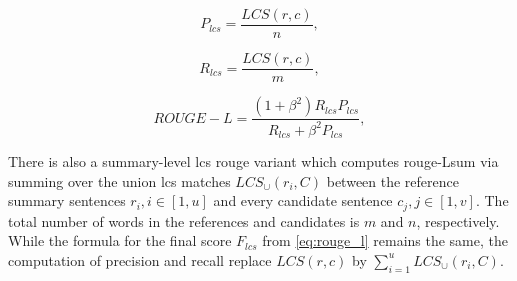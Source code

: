 \begin{equation}
P_{lcs} = \frac{LCS(r,c)}{n},
\label{eq:rouge_l_precision}
\end{equation}

\begin{equation}
R_{lcs} = \frac{LCS(r,c)}{m},
\label{eq:rouge_l_recall}
\end{equation}

\begin{equation}
ROUGE-L = \frac{(1 + \beta^2)R_{lcs}P_{lcs}}{R_{lcs} + \beta^2 P_{lcs}},
\label{eq:rouge_l}
\end{equation}

There is also a summary-level \ac{lcs} \ac{rouge} variant which computes \ac{rouge}-Lsum via summing over the union \ac{lcs} matches $LCS_\cup(r_i,C)$ between the reference summary sentences $r_i, i \in [1,u]$ and every candidate sentence $c_j, j \in [1,v]$.
The total number of words in the references and candidates is $m$ and $n$, respectively.
While the formula for the final score $F_{lcs}$ from \autoref{eq:rouge_l} remains the same, the computation of precision and recall replace $LCS(r,c)$ by $\sum_{i=1}^{u}LCS_\cup(r_i,C)$.
